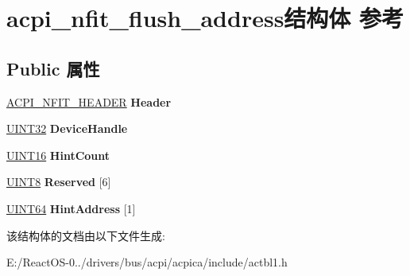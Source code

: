 \hypertarget{structacpi__nfit__flush__address}{}\section{acpi\+\_\+nfit\+\_\+flush\+\_\+address结构体 参考}
\label{structacpi__nfit__flush__address}
\subsection*{Public 属性}
\begin{DoxyCompactItemize}
\item 
\mbox{\label{structacpi__nfit__flush__address_a06d27aad5260aae65d1b2ce09431e488}} 
\hyperlink{structacpi__nfit__header}{A\+C\+P\+I\+\_\+\+N\+F\+I\+T\+\_\+\+H\+E\+A\+D\+ER} {\bfseries Header}
\item 
\mbox{\label{structacpi__nfit__flush__address_aa21c4933facca97a9e77be494c49b202}} 
\hyperlink{_processor_bind_8h_ae1e6edbbc26d6fbc71a90190d0266018}{U\+I\+N\+T32} {\bfseries Device\+Handle}
\item 
\mbox{\label{structacpi__nfit__flush__address_afc4be9222313a6b8e16801f0a9faa0f6}} 
\hyperlink{_processor_bind_8h_a09f1a1fb2293e33483cc8d44aefb1eb1}{U\+I\+N\+T16} {\bfseries Hint\+Count}
\item 
\mbox{\label{structacpi__nfit__flush__address_af03de3eaec587a41d7e7eb10c13d02b5}} 
\hyperlink{_processor_bind_8h_ab27e9918b538ce9d8ca692479b375b6a}{U\+I\+N\+T8} {\bfseries Reserved} \mbox{[}6\mbox{]}
\item 
\mbox{\label{structacpi__nfit__flush__address_a70864c4ff2bef8c7a6e0585348b3ad66}} 
\hyperlink{_processor_bind_8h_a57be03562867144161c1bfee95ca8f7c}{U\+I\+N\+T64} {\bfseries Hint\+Address} \mbox{[}1\mbox{]}
\end{DoxyCompactItemize}


该结构体的文档由以下文件生成\+:\begin{DoxyCompactItemize}
\item 
E\+:/\+React\+O\+S-\/0../drivers/bus/acpi/acpica/include/actbl1.\+h\end{DoxyCompactItemize}
